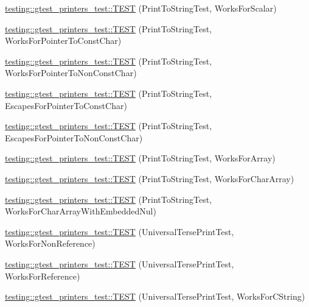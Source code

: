 \begin{DoxyCompactItemize}
\hyperlink{namespacetesting_1_1gtest__printers__test_a5d1bc4b12c18ccaec2ced9f45c092567}{testing\-::gtest\-\_\-printers\-\_\-test\-::\-T\-E\-S\-T} (Print\-To\-String\-Test, Works\-For\-Scalar)
\item 
\hyperlink{namespacetesting_1_1gtest__printers__test_a68100148758516ebab9c761ca7778586}{testing\-::gtest\-\_\-printers\-\_\-test\-::\-T\-E\-S\-T} (Print\-To\-String\-Test, Works\-For\-Pointer\-To\-Const\-Char)
\item 
\hyperlink{namespacetesting_1_1gtest__printers__test_a1db34d8760c17157572ce2877007d15a}{testing\-::gtest\-\_\-printers\-\_\-test\-::\-T\-E\-S\-T} (Print\-To\-String\-Test, Works\-For\-Pointer\-To\-Non\-Const\-Char)
\item 
\hyperlink{namespacetesting_1_1gtest__printers__test_ab8fce4287e837cfcd851ded56b62f9ce}{testing\-::gtest\-\_\-printers\-\_\-test\-::\-T\-E\-S\-T} (Print\-To\-String\-Test, Escapes\-For\-Pointer\-To\-Const\-Char)
\item 
\hyperlink{namespacetesting_1_1gtest__printers__test_a7203081ef422f0835643d2c54b8ebf28}{testing\-::gtest\-\_\-printers\-\_\-test\-::\-T\-E\-S\-T} (Print\-To\-String\-Test, Escapes\-For\-Pointer\-To\-Non\-Const\-Char)
\item 
\hyperlink{namespacetesting_1_1gtest__printers__test_a78bd89af8a8505880b78ec2a001d3cb8}{testing\-::gtest\-\_\-printers\-\_\-test\-::\-T\-E\-S\-T} (Print\-To\-String\-Test, Works\-For\-Array)
\item 
\hyperlink{namespacetesting_1_1gtest__printers__test_ad122dc21e7ebad023d7048ef117a1129}{testing\-::gtest\-\_\-printers\-\_\-test\-::\-T\-E\-S\-T} (Print\-To\-String\-Test, Works\-For\-Char\-Array)
\item 
\hyperlink{namespacetesting_1_1gtest__printers__test_a65e208358dddc7747f4519410c71d877}{testing\-::gtest\-\_\-printers\-\_\-test\-::\-T\-E\-S\-T} (Print\-To\-String\-Test, Works\-For\-Char\-Array\-With\-Embedded\-Nul)
\item 
\hyperlink{namespacetesting_1_1gtest__printers__test_ab49ff6527b0b01411b725fe46e1af65c}{testing\-::gtest\-\_\-printers\-\_\-test\-::\-T\-E\-S\-T} (Universal\-Terse\-Print\-Test, Works\-For\-Non\-Reference)
\item 
\hyperlink{namespacetesting_1_1gtest__printers__test_ab7adb58a0e08e0830157a5a1c7bceac5}{testing\-::gtest\-\_\-printers\-\_\-test\-::\-T\-E\-S\-T} (Universal\-Terse\-Print\-Test, Works\-For\-Reference)
\item 
\hyperlink{namespacetesting_1_1gtest__printers__test_ab11252e228a240a349d747546bc222d2}{testing\-::gtest\-\_\-printers\-\_\-test\-::\-T\-E\-S\-T} (Universal\-Terse\-Print\-Test, Works\-For\-C\-String)

\end{DoxyCompactItemize}
